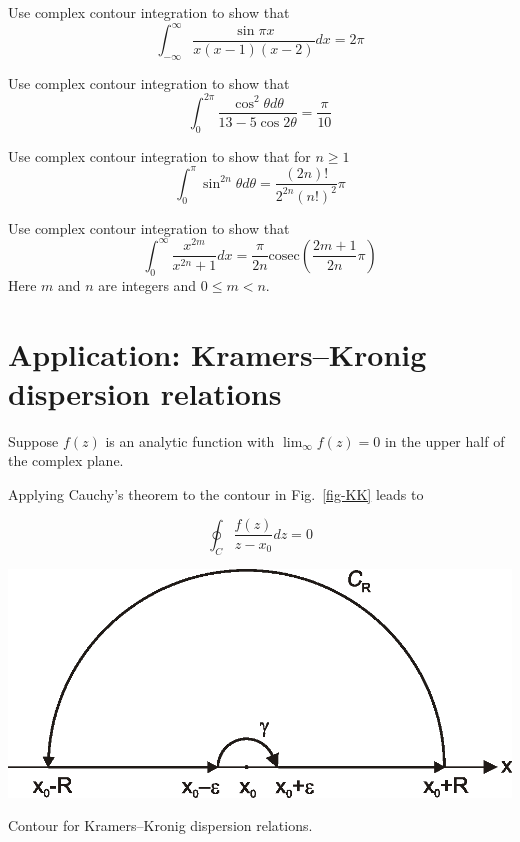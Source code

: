 \begin{exer}
Use complex contour integration to show that
$$ \int_{-\infty}^{\infty} \frac{\sin \pi x}{x (x-1) (x-2)} dx = 2 \pi$$
\end{exer}

\begin{exer}
Use complex contour integration to show that
$$ \int_0^{2\pi} \frac{\cos^2 \theta d \theta}{13-5\cos 2 \theta} = \frac{\pi}{10}$$
\end{exer}

\begin{exer}
Use complex contour integration to show that for $n \ge 1$
$$ \int_0^\pi \sin^{2n} \theta d \theta = \frac{(2n)!}{ 2^{2n}(n!)^2} \pi$$
\end{exer}

\begin{exer}
Use complex contour integration to show that
$$ \int_0^\infty \frac{x ^ {2m}}{x^{2n} + 1} dx = \frac{\pi}{2n} \mathrm{cosec}  \left( \frac{2m+1}{2n} \pi \right)$$
Here $m$ and $n$ are integers and $0 \le m < n$.
\end{exer}


\section{Application: Kramers--Kronig dispersion relations}

Suppose $f(z)$ is an analytic function with $\lim_\infty f(z) = 0$ in the upper half of the complex plane.

Applying Cauchy's theorem to the contour in Fig.~\ref{fig-KK} leads to

\begin{equation}
\oint_{{C}} \frac{f(z)}{z-x_0} dz = 0
\end{equation}

\begin{marginfigure}
\centering
\includegraphics{complex/figures/kk}
\caption{Contour for Kramers--Kronig dispersion relations.}
\label{fig-KK}
\end{marginfigure}

